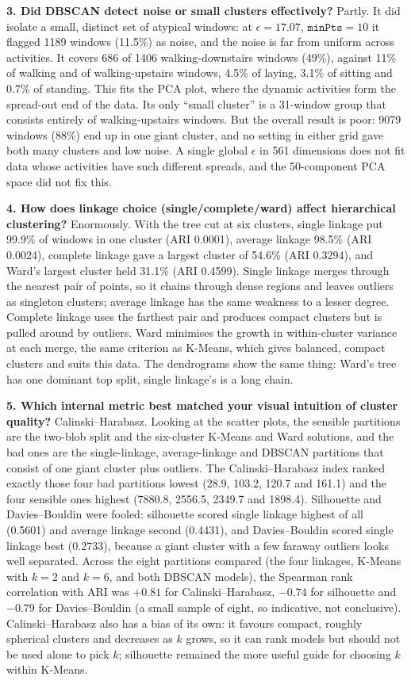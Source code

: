 \documentclass[12pt,a4paper]{article}
\begin{document}
\textbf{3. Did DBSCAN detect noise or small clusters effectively?} Partly. It did isolate a
small, distinct set of atypical windows: at $\epsilon=17.07$, $\texttt{minPts}=10$ it flagged
1189 windows (11.5\%) as noise, and the noise is far from uniform across activities. It covers
686 of 1406 walking-downstairs windows (49\%), against 11\% of walking and of walking-upstairs
windows, 4.5\% of laying, 3.1\% of sitting and 0.7\% of standing. This fits the PCA plot, where the dynamic
activities form the spread-out end of the data. Its only ``small
cluster'' is a 31-window group that consists entirely of walking-upstairs windows. But the
overall result is poor: 9079 windows (88\%) end up in one giant cluster, and no setting in either
grid gave both many clusters and low noise. A single global $\epsilon$ in 561 dimensions does
not fit data whose activities have such different spreads, and the 50-component PCA space did
not fix this.

\textbf{4. How does linkage choice (single/complete/ward) affect hierarchical clustering?}
Enormously. With the tree cut at six clusters, single linkage put 99.9\% of windows in one cluster
(ARI 0.0001), average linkage 98.5\% (ARI 0.0024), complete linkage gave a largest cluster of
54.6\% (ARI 0.3294), and Ward's largest cluster held 31.1\% (ARI 0.4599). Single linkage merges
through the nearest pair of points, so it chains through dense regions and leaves outliers as
singleton clusters; average linkage has the same weakness to a lesser degree. Complete linkage
uses the farthest pair and produces compact clusters but is pulled around by outliers. Ward
minimises the growth in within-cluster variance at each merge, the same criterion as K-Means, which
gives balanced, compact clusters and suits this data. The dendrograms show the same thing:
Ward's tree has one dominant top split, single linkage's is a long chain.

\textbf{5. Which internal metric best matched your visual intuition of cluster quality?}
Calinski--Harabasz. Looking at the scatter plots, the sensible partitions are the two-blob split
and the six-cluster K-Means and Ward solutions, and the bad ones are the single-linkage,
average-linkage and DBSCAN partitions that consist of one giant cluster plus outliers. The
Calinski--Harabasz index ranked exactly those four bad partitions lowest (28.9, 103.2, 120.7 and
161.1) and the four sensible ones highest (7880.8, 2556.5, 2349.7 and 1898.4). Silhouette and
Davies--Bouldin were fooled: silhouette scored single linkage highest of all (0.5601) and average
linkage second (0.4431), and Davies--Bouldin scored single linkage best (0.2733), because a
giant cluster with a few faraway outliers looks well separated. Across the eight
partitions compared (the four linkages, K-Means with $k=2$ and $k=6$, and both DBSCAN models),
the Spearman rank correlation with ARI was $+0.81$ for Calinski--Harabasz, $-0.74$ for
silhouette and $-0.79$ for Davies--Bouldin (a small sample of eight, so indicative, not
conclusive). Calinski--Harabasz also has a bias of its own: it favours compact, roughly
spherical clusters and decreases as $k$ grows, so it can rank models but should not be used
alone to pick $k$; silhouette remained the more useful guide for choosing $k$ within K-Means.
\end{document}
